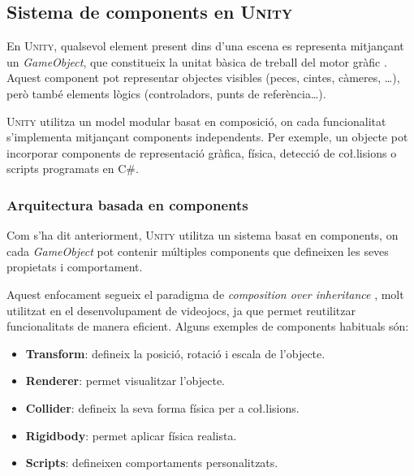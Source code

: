 \documentclass[a4paper,11pt,DIV=13,headings=normal,abstract=true,twoside=semi]{article}
\newcommand{\acro}[1]{\textsc{#1}}
\begin{document}
\subsection{Sistema de components en \acro{Unity}}


En \acro{Unity}, qualsevol element present dins d'una escena es representa mitjançant un \emph{GameObject}, que constitueix la unitat bàsica de treball del motor gràfic \cite{UnityGameObjects}. Aquest component pot representar objectes visibles (peces, cintes, càmeres, \dots), però també elements lògics (controladors, punts de referència\dots). 

\acro{Unity} utilitza un model modular basat en composició, on cada funcionalitat s'implementa mitjançant components independents. Per exemple, un objecte pot incorporar components de representació gràfica, física, detecció de co\l.lisions o scripts programats en C\#.

\subsubsection{Arquitectura basada en components}

Com s'ha dit anteriorment, \acro{Unity} utilitza un sistema basat en components, on cada \emph{GameObject} pot contenir múltiples components que defineixen les seves propietats i comportament.

Aquest enfocament segueix el paradigma de \emph{composition over inheritance} \cite{UnityComponents}, molt utilitzat en el desenvolupament de videojocs, ja que permet reutilitzar funcionalitats de manera eficient. Alguns exemples de components habituals són:

\begin{itemize}
\item \textbf{Transform}: defineix la posició, rotació i escala de l'objecte.
\item \textbf{Renderer}: permet visualitzar l'objecte.
\item \textbf{Collider}: defineix la seva forma física per a co\l.lisions.
\item \textbf{Rigidbody}: permet aplicar física realista.
\item \textbf{Scripts}: defineixen comportaments personalitzats.
\end{itemize}
\end{document}
